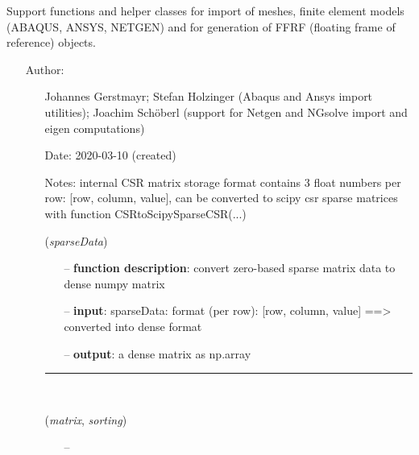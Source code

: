 \begin{itemize}[leftmargin=1.4cm]
\begin{itemize}[leftmargin=1.4cm]
\begin{itemize}[leftmargin=0.5cm]
\begin{itemize}[leftmargin=1.4cm]
%
\label{sec:module:FEM}
  Support functions and helper classes for import of meshes, finite element models (ABAQUS, ANSYS, NETGEN) and for generation of FFRF (floating frame of reference) objects.
\begin{itemize}[leftmargin=1.4cm]
\setlength{\itemindent}{-1.4cm}
\item[]Author:
\vspace{-22pt}\begin{itemize}[leftmargin=0.5cm]
\setlength{\itemindent}{-0.5cm}
\item[]   Johannes Gerstmayr; Stefan Holzinger (Abaqus and Ansys import utilities); Joachim Sch\"oberl (support for Netgen and NGsolve \cite{Schoeberl1997,NGsolve2014,NGsolve2022} import and eigen computations) 
\ei
\item[]Date:      2020-03-10 (created)
\item[]Notes:  	internal CSR matrix storage format contains 3 float numbers per row: [row, column, value], can be converted to scipy csr sparse matrices with function CSRtoScipySparseCSR(...)
\ei
\begin{flushleft}
\label{sec:FEM:CompressedRowSparseToDenseMatrix}
({\it sparseData})
\end{flushleft}
\setlength{\itemindent}{0.7cm}
\begin{itemize}[leftmargin=0.7cm]
\item[--]
{\bf function description}: convert zero-based sparse matrix data to dense numpy matrix
\item[--]
{\bf input}: sparseData: format (per row): [row, column, value] ==> converted into dense format
\item[--]
{\bf output}: a dense matrix as np.array
\vspace{12pt}\end{itemize}
%
\noindent\rule{8cm}{0.75pt}\vspace{1pt} \\ 
\begin{flushleft}
\label{sec:FEM:MapSparseMatrixIndices}
({\it matrix}, {\it sorting})
\end{flushleft}
\setlength{\itemindent}{0.7cm}
\begin{itemize}[leftmargin=0.7cm]
\item[--]

\end{itemize}
\end{itemize}
\end{itemize}
\end{itemize}
\end{itemize}
\end{itemize}
\end{itemize}
